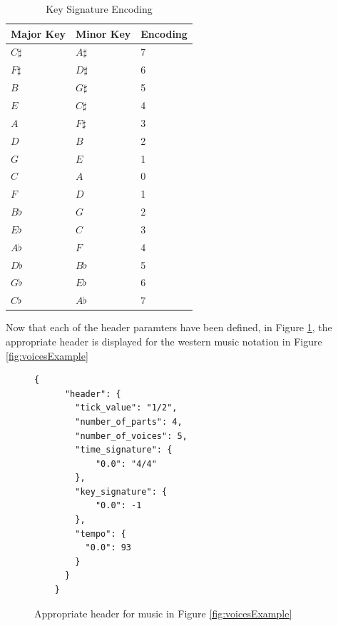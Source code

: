 \begin{table}[ht]
  \centering
  \begin{tabular}{lll}
    Major Key & Minor Key & Encoding \\ \hline
    $C\sharp$   & $A\sharp$   & 7        \\
    $F\sharp$   & $D\sharp$   & 6        \\
    $B$         & $G\sharp$   & 5        \\
    $E$         & $C\sharp$   & 4        \\
    $A$         & $F\sharp$   & 3        \\
    $D$         & $B$         & 2        \\
    $G$         & $E$         & 1        \\
    $C$         & $A$         & 0        \\
    $F$         & $D$         & 1        \\
    $B\flat$    & $G$         & 2        \\
    $E\flat$    & $C$         & 3        \\
    $A\flat$    & $F$         & 4        \\
    $D\flat$    & $B\flat$    & 5        \\
    $G\flat$    & $E\flat$    & 6        \\
    $C\flat$    & $A\flat$    & 7        
  \end{tabular}
  \caption{Key Signature Encoding}
  \label{tab:keySignatures}
\end{table}

Now that each of the header paramters have been defined, in Figure \ref{fig:voicesHeader}, the appropriate header is displayed for the western music notation in Figure \ref{fig:voicesExample}

\begin{figure}
  \begin{center}
    \begin{Verbatim}[fontfamily=courier, xleftmargin=\parindent]
    {
      "header": {
        "tick_value": "1/2",
        "number_of_parts": 4,
        "number_of_voices": 5,
        "time_signature": {
            "0.0": "4/4"
        },
        "key_signature": {
            "0.0": -1
        },
        "tempo": {
          "0.0": 93
        }
      }
    }
    \end{Verbatim}
    \caption{Appropriate header for music in Figure \ref{fig:voicesExample}}
    \label{fig:voicesHeader}
  \end{center}
\end{figure}

